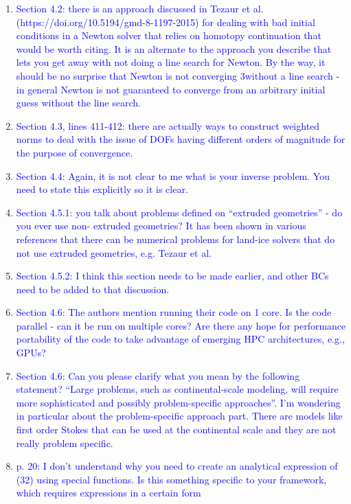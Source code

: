 \documentclass{article}
\theoremstyle{definition}
\theoremstyle{plain}
\begin{document}
\begin{enumerate}
{a manufactured problem to ensure that it was implemented correctly?}
\item \textcolor{blue}{Section 4.2: there is an approach discussed in Tezaur et al. (https://doi.org/10.5194/gmd-8-1197-2015)
for dealing with bad initial conditions in a Newton solver that relies on homotopy continuation that
would be worth citing. It is an alternate to the approach you describe that lets you get away with not
doing a line search for Newton. By the way, it should be no surprise that Newton is not converging
3without a line search - in general Newton is not guaranteed to converge from an arbitrary initial
guess without the line search.}
\item \textcolor{blue}{Section 4.3, lines 411-412: there are actually ways to construct weighted norms to deal with the issue
of DOFs having different orders of magnitude for the purpose of convergence.}
\item \textcolor{blue}{Section 4.4: Again, it is not clear to me what is your inverse problem. You need to state this explicitly
so it is clear.}
\item \textcolor{blue}{Section 4.5.1: you talk about problems defined on “extruded geometries” - do you ever use non-
extruded geometries? It has been shown in various references that there can be numerical problems
for land-ice solvers that do not use extruded geometries, e.g. Tezaur et al.}
\item \textcolor{blue}{Section 4.5.2: I think this section needs to be made earlier, and other BCs need to be added to that
discussion.}
\item \textcolor{blue}{Section 4.6: The authors mention running their code on 1 core. Is the code parallel - can it be run
on multiple cores? Are there any hope for performance portability of the code to take advantage of
emerging HPC architectures, e.g., GPUs?}
\item \textcolor{blue}{Section 4.6: Can you please clarify what you mean by the following statement? “Large problems,
such as continental-scale modeling, will require more sophisticated and possibly problem-specific
approaches”. I’m wondering in particular about the problem-specific approach part. There are
models like first order Stokes that can be used at the continental scale and they are not really
problem specific.}
\item \textcolor{blue}{p. 20: I don’t understand why you need to create an analytical expression of (32) using special
functions. Is this something specific to your framework, which requires expressions in a certain form
}
\end{enumerate}
\end{document}
